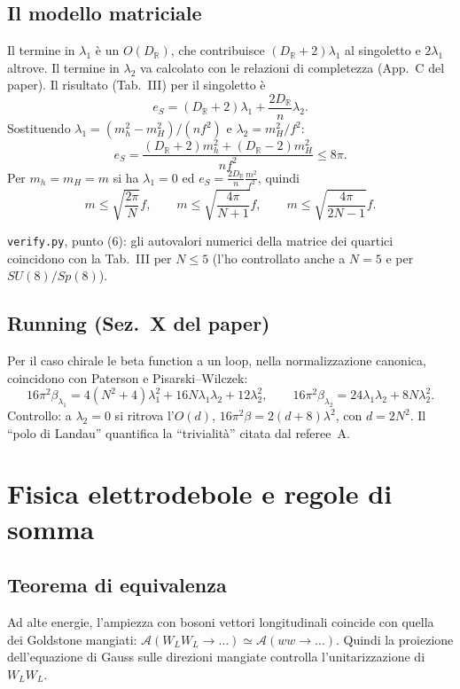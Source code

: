 \documentclass[11pt,a4paper]{article}
\numberwithin{equation}{section}
\theoremstyle{remark}
\newcommand{\R}{\mathbb{R}}
\begin{document}
\subsection{Il modello matriciale}

Il termine in $\lambda_1$ è un $O(D_\R)$, che contribuisce $(D_\R+2)\lambda_1$ al singoletto e $2\lambda_1$ altrove. Il termine in $\lambda_2$ va calcolato con le relazioni di completezza (App.~C del paper). Il risultato (Tab.~III) per il singoletto è
\[
e_S=(D_\R+2)\lambda_1+\frac{2D_\R}{n}\lambda_2 .
\]
Sostituendo $\lambda_1=(m_h^2-m_H^2)/(nf^2)$ e $\lambda_2=m_H^2/f^2$:
\[
e_S=\frac{(D_\R+2)m_h^2+(D_\R-2)m_H^2}{nf^2}\le8\pi .
\]
Per $m_h=m_H=m$ si ha $\lambda_1=0$ ed $e_S=\frac{2D_\R}{n}\frac{m^2}{f^2}$, quindi
\[
m\le\sqrt{\frac{2\pi}N}f,\qquad m\le\sqrt{\frac{4\pi}{N+1}}f,\qquad m\le\sqrt{\frac{4\pi}{2N-1}}f .
\]
\begin{verifica}
\texttt{verify.py}, punto (6): gli autovalori numerici della matrice dei quartici coincidono con la Tab.~III per $N\le5$ (l'ho controllato anche a $N=5$ e per $SU(8)/Sp(8)$).
\end{verifica}

\subsection{Running (Sez.~X del paper)}

Per il caso chirale le beta function a un loop, nella normalizzazione canonica, coincidono con Paterson e Pisarski--Wilczek:
\[
16\pi^2\beta_{\lambda_1}=4(N^2+4)\lambda_1^2+16N\lambda_1\lambda_2+12\lambda_2^2,\qquad16\pi^2\beta_{\lambda_2}=24\lambda_1\lambda_2+8N\lambda_2^2 .
\]
Controllo: a $\lambda_2=0$ si ritrova l'$O(d)$, $16\pi^2\beta=2(d+8)\lambda^2$, con $d=2N^2$. Il ``polo di Landau'' quantifica la ``trivialità'' citata dal referee~A.

\section{Fisica elettrodebole e regole di somma}
\label{sec:ew}

\subsection{Teorema di equivalenza}

Ad alte energie, l'ampiezza con bosoni vettori longitudinali coincide con quella dei Goldstone mangiati: $\mathcal A(W_LW_L\to\dots)\simeq\mathcal A(ww\to\dots)$. Quindi la proiezione dell'equazione di Gauss sulle direzioni mangiate controlla l'unitarizzazione di $W_LW_L$.
\end{document}
